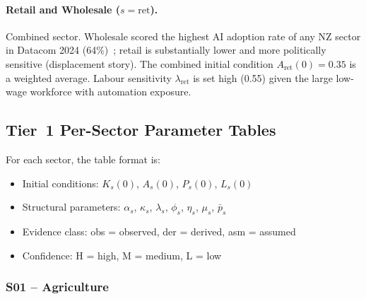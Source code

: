 \documentclass[11pt,a4paper]{article}
\begin{document}
\paragraph{Retail and Wholesale ($s = \text{ret}$).} Combined sector. Wholesale scored the highest AI adoption rate of any NZ sector in Datacom 2024 (64\%)~\cite{datacom2024}; retail is substantially lower and more politically sensitive (displacement story). The combined initial condition $A_{\text{ret}}(0) = 0.35$ is a weighted average. Labour sensitivity $\lambda_{\text{ret}}$ is set high (0.55) given the large low-wage workforce with automation exposure.

\subsection{Tier~1 Per-Sector Parameter Tables}

For each sector, the table format is:
\begin{itemize}
  \item Initial conditions: $K_s(0)$, $A_s(0)$, $P_s(0)$, $L_s(0)$
  \item Structural parameters: $\alpha_s$, $\kappa_s$, $\lambda_s$, $\phi_s$, $\eta_s$, $\mu_s$, $\bar{p}_s$
  \item Evidence class: obs = observed, der = derived, asm = assumed
  \item Confidence: H = high, M = medium, L = low
\end{itemize}

\subsubsection*{S01 -- Agriculture}
\end{document}
